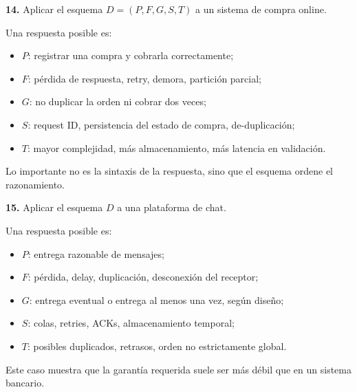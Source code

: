 \documentclass[variant=guia,cover=institutional,mode=screen]{ua-engineering-v6-article}
\begin{document}
\begin{uaexercise}
\textbf{14.}
Aplicar el esquema $D=(P,F,G,S,T)$ a un sistema de compra online.
\end{uaexercise}
\begin{uaanswer}
Una respuesta posible es:

\begin{itemize}
\item $P$: registrar una compra y cobrarla correctamente;
\item $F$: pérdida de respuesta, retry, demora, partición parcial;
\item $G$: no duplicar la orden ni cobrar dos veces;
\item $S$: request ID, persistencia del estado de compra, de-duplicación;
\item $T$: mayor complejidad, más almacenamiento, más latencia en validación.
\end{itemize}

Lo importante no es la sintaxis de la respuesta, sino que el esquema ordene el razonamiento.
\end{uaanswer}

\begin{uaexercise}
\textbf{15.}
Aplicar el esquema $D$ a una plataforma de chat.
\end{uaexercise}
\begin{uaanswer}
Una respuesta posible es:

\begin{itemize}
\item $P$: entrega razonable de mensajes;
\item $F$: pérdida, delay, duplicación, desconexión del receptor;
\item $G$: entrega eventual o entrega al menos una vez, según diseño;
\item $S$: colas, retries, ACKs, almacenamiento temporal;
\item $T$: posibles duplicados, retrasos, orden no estrictamente global.
\end{itemize}

Este caso muestra que la garantía requerida suele ser más débil que en un sistema bancario.
\end{uaanswer}
\end{document}
